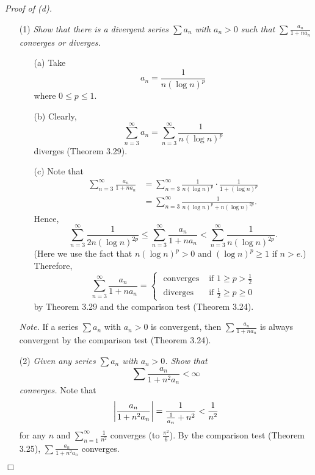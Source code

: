 \documentclass{article}
\begin{document}
\emph{Proof of (d).}
\begin{enumerate}
  \item[(1)]
  \emph{Show that there is a divergent series $\sum a_n$ with $a_n > 0$
  such that $\sum \frac{a_n}{1+na_n}$ converges or diverges.}
    \begin{enumerate}
      \item[(a)]
      Take $$a_n = \frac{1}{n(\log n)^p}$$
      where $0 \leq p \leq 1$.
      \item[(b)]
      Clearly,
      $$\sum_{n=3}^{\infty} a_n = \sum_{n=3}^{\infty} \frac{1}{n(\log n)^p}$$
      diverges (Theorem 3.29).
      \item[(c)]
      Note that
      \begin{align*}
        \sum_{n=3}^{\infty} \frac{a_n}{1+na_n}
        &= \sum_{n=3}^{\infty} \frac{1}{n(\log n)^p} \cdot \frac{1}{1 + (\log n)^p} \\
        &= \sum_{n=3}^{\infty} \frac{1}{n(\log n)^p + n(\log n)^{2p}}.
      \end{align*}
      Hence,
      $$ \sum_{n=3}^{\infty} \frac{1}{2n(\log n)^{2p}}
      \leq \sum_{n=3}^{\infty} \frac{a_n}{1+na_n}
      < \sum_{n=3}^{\infty} \frac{1}{n(\log n)^{2p}}.$$
      (Here we use the fact that $n(\log n)^p > 0$ and $(\log n)^p \geq 1$ if $n > e$.)
      Therefore,
      \begin{equation*}
        \sum_{n=3}^{\infty} \frac{a_n}{1+na_n} =
        \begin{cases}
          \text{ converges } & \text{if $1 \geq p > \frac{1}{2}$} \\
          \text{ diverges }  & \text{if $\frac{1}{2} \geq p \geq 0$}
        \end{cases}
      \end{equation*}
      by Theorem 3.29 and the comparison test (Theorem 3.24).
    \end{enumerate}
    \emph{Note.} If a series $\sum a_n$ with $a_n > 0$ is convergent,
    then $\sum \frac{a_n}{1+na_n}$ is always convergent
    by the comparison test (Theorem 3.24).
  \item[(2)]
  \emph{Given any series $\sum a_n$ with $a_n > 0$.
  Show that $$\sum \frac{a_n}{1+n^2a_n} < \infty$$
  converges.}
  Note that
  $$\abs{ \frac{a_n}{1+n^2a_n} }
  = \frac{1}{\frac{1}{a_n}+n^2}
  < \frac{1}{n^2}$$
  for any $n$ and $\sum_{n=1}^{\infty} \frac{1}{n^2}$ converges (to $\frac{\pi^2}{6}$).
  By the comparison test (Theorem 3.25),
  $\sum \frac{a_n}{1+n^2a_n}$ converges.
\end{enumerate}
$\Box$ \\\\
\end{document}
